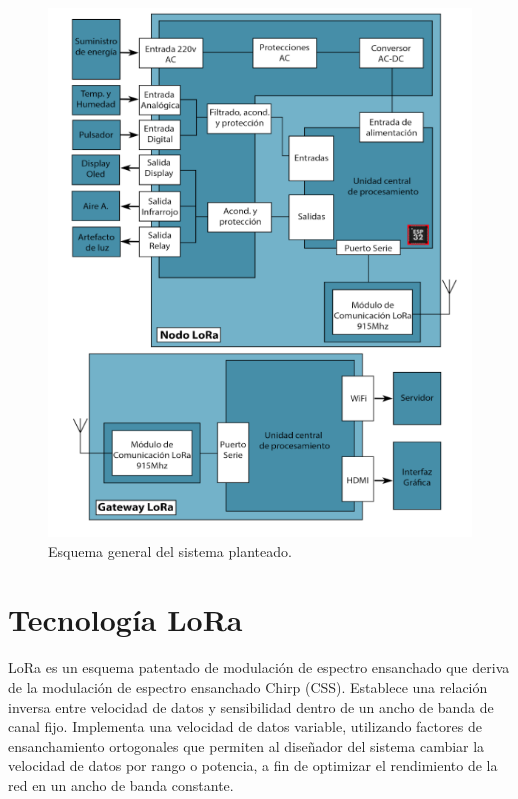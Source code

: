 \begin{figure}[ht!]
	\centering
	\includegraphics[width=1\textwidth]{./Figures/requerimientos2.png}
	\caption{Esquema general del sistema planteado.}
	\label{fig:requerimientos2}
\end{figure}

\section{Tecnología LoRa}
\label{sec:tecnologialora}

LoRa es un esquema patentado de modulación de espectro ensanchado que deriva de la modulación de espectro ensanchado Chirp (CSS). Establece una relación inversa entre velocidad de datos y sensibilidad dentro de un ancho de banda de canal fijo. Implementa una velocidad de datos variable, utilizando factores de ensanchamiento ortogonales que permiten al diseñador del sistema cambiar la velocidad de datos por rango o potencia, a fin de optimizar el rendimiento de la red en un ancho de banda constante.

